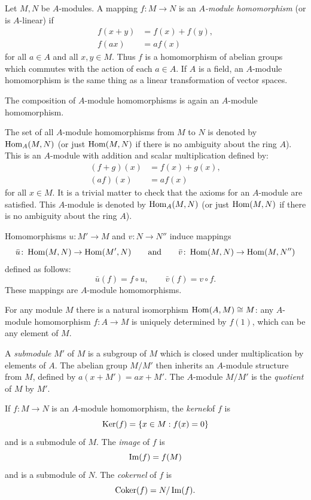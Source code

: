 Let $M, N$ be $A$-modules. A mapping $f \colon M \to N$ is an \emph{$A$-module homomorphism} (or is $A$-linear) if
\begin{align*}
    f(x + y) &= f(x) + f(y), \\
    f(ax) &= af(x)
\end{align*}
for all $a \in A$ and all $x, y \in M$. Thus $f$ is a homomorphism of abelian groups which commutes with the action of each $a\in A$. If $A$ is a field, an $A$-module homomorphism is the same thing as a linear transformation of vector spaces.

The composition of $A$-module homomorphisms is again an $A$-module homomorphism.

The set of all $A$-module homomorphisms from $M$ to $N$ is denoted by $\operatorname{Hom}_A(M, N)$ (or just $\operatorname{Hom}(M, N)$ if there is no ambiguity about the ring $A$). This is an $A$-module with addition and scalar multiplication defined by:
\begin{align*}
    (f + g)(x) &= f(x) + g(x), \\
    (af)(x) &= af(x)
\end{align*}
for all $x \in M$. It is a trivial matter to check that the axioms for an $A$-module are satisfied. This $A$-module is denoted by $\operatorname{Hom}_A(M,N)$ (or just $\operatorname{Hom}(M,N)$ if there is no ambiguity about the ring $A$).

Homomorphisms $u \colon M' \to M$ and $v \colon N \to N''$ induce mappings
\[
    \bar{u} \colon \operatorname{Hom}(M, N) \to \operatorname{Hom}(M', N) \qquad \text{and} \qquad \bar{v} \colon \operatorname{Hom}(M, N) \to \operatorname{Hom}(M, N'')
\]
defined as follows:
\[
    \bar{u}(f) = f \circ u, \qquad \bar{v}(f) = v \circ f.
\]
These mappings are $A$-module homomorphisms.

For any module $M$ there is a natural isomorphism $\operatorname{Hom}(A, M) \cong M$: any $A$-module homomorphism $f \colon A \to M$ is uniquely determined by $f(1)$, which can be any element of $M$.


A \emph{submodule} $M'$ of $M$ is a subgroup of $M$ which is closed under multiplication by elements of $A$. The abelian group $M/M'$ then inherits an $A$-module structure from $M$, defined by $a(x + M') = ax + M'$. The $A$-module $M/M'$ is the \emph{quotient} of $M$ by $M'$.

If $f \colon M \to N$ is an $A$-module homomorphism, the \emph{kernel}of $f$ is
\[
    \operatorname{Ker}(f) = \{x \in M : f(x) = 0\}
\]
and is a submodule of $M$. The \emph{image} of $f$ is
\[
    \operatorname{Im}(f) = f(M)
\]
and is a submodule of $N$. The \emph{cokernel} of $f$ is
\[
    \operatorname{Coker}(f) = N/\operatorname{Im}(f).
\]


